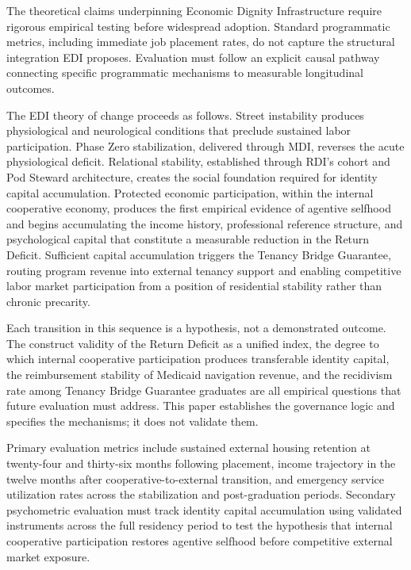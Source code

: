 \documentclass[12pt, letterpaper]{article}
\begin{document}
The theoretical claims underpinning Economic Dignity Infrastructure require rigorous empirical testing before widespread adoption. Standard programmatic metrics, including immediate job placement rates, do not capture the structural integration EDI proposes. Evaluation must follow an explicit causal pathway connecting specific programmatic mechanisms to measurable longitudinal outcomes.

The EDI theory of change proceeds as follows. Street instability produces physiological and neurological conditions that preclude sustained labor participation. Phase Zero stabilization, delivered through MDI, reverses the acute physiological deficit. Relational stability, established through RDI's cohort and Pod Steward architecture, creates the social foundation required for identity capital accumulation. Protected economic participation, within the internal cooperative economy, produces the first empirical evidence of agentive selfhood and begins accumulating the income history, professional reference structure, and psychological capital that constitute a measurable reduction in the Return Deficit. Sufficient capital accumulation triggers the Tenancy Bridge Guarantee, routing program revenue into external tenancy support and enabling competitive labor market participation from a position of residential stability rather than chronic precarity.

Each transition in this sequence is a hypothesis, not a demonstrated outcome. The construct validity of the Return Deficit as a unified index, the degree to which internal cooperative participation produces transferable identity capital, the reimbursement stability of Medicaid navigation revenue, and the recidivism rate among Tenancy Bridge Guarantee graduates are all empirical questions that future evaluation must address. This paper establishes the governance logic and specifies the mechanisms; it does not validate them.

Primary evaluation metrics include sustained external housing retention at twenty-four and thirty-six months following placement, income trajectory in the twelve months after cooperative-to-external transition, and emergency service utilization rates across the stabilization and post-graduation periods. Secondary psychometric evaluation must track identity capital accumulation using validated instruments across the full residency period to test the hypothesis that internal cooperative participation restores agentive selfhood before competitive external market exposure.
\end{document}
